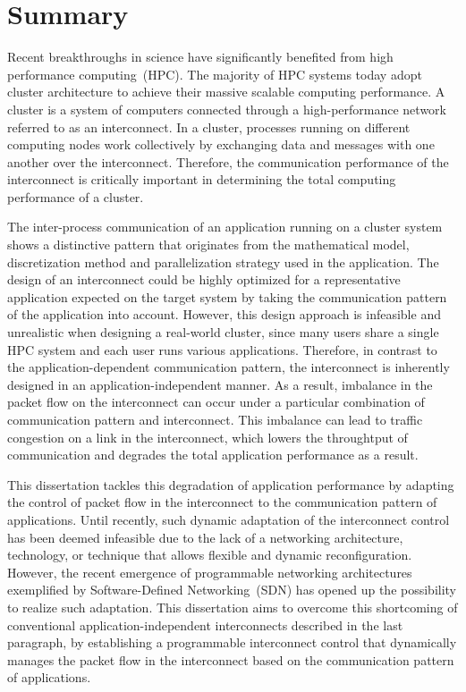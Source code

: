 \pagestyle{myheadings}
\markright{}
\chapter*{Summary}

Recent breakthroughs in science have significantly benefited from high
performance computing~(HPC). The majority of HPC systems today adopt cluster
architecture to achieve their massive scalable computing performance. A
cluster is a system of computers connected through a high-performance network
referred to as an interconnect. In a cluster, processes running on different
computing nodes work collectively by exchanging data and messages with one
another over the interconnect. Therefore, the communication performance of the
interconnect is critically important in determining the total computing
performance of a cluster.

The inter-process communication of an application running on a cluster system
shows a distinctive pattern that originates from the mathematical model,
discretization method and parallelization strategy used in the application.
The design of an interconnect could be highly optimized for a representative
application expected on the target system by taking the communication pattern
of the application into account. However, this design approach is infeasible
and unrealistic when designing a real-world cluster, since many users share a
single HPC system and each user runs various applications. Therefore, in
contrast to the application-dependent communication pattern, the interconnect
is inherently designed in an application-independent manner. As a result,
imbalance in the packet flow on the interconnect can occur under a particular
combination of communication pattern and interconnect. This imbalance can lead
to traffic congestion on a link in the interconnect, which lowers the
throughtput of communication and degrades the total application performance as
a result.

This dissertation tackles this degradation of application performance by
adapting the control of packet flow in the interconnect to the communication
pattern of applications. Until recently, such dynamic adaptation of the
interconnect control has been deemed infeasible due to the lack of a
networking architecture, technology, or technique that allows flexible and
dynamic reconfiguration. However, the recent emergence of programmable
networking architectures exemplified by Software-Defined Networking~(SDN) has
opened up the possibility to realize such adaptation. This dissertation aims
to overcome this shortcoming of conventional application-independent
interconnects described in the last paragraph, by establishing a programmable
interconnect control that dynamically manages the packet flow in the
interconnect based on the communication pattern of applications.

